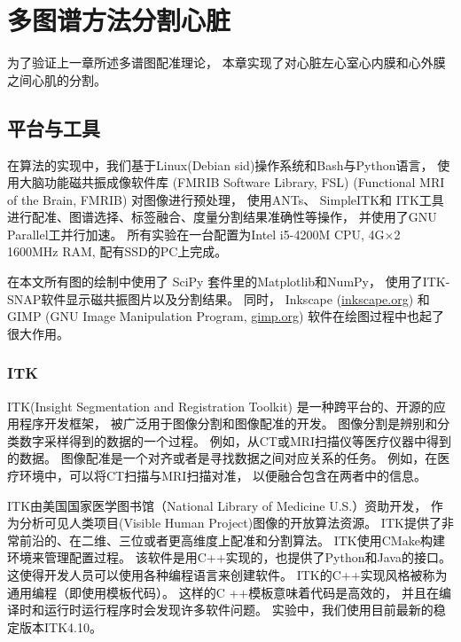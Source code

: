 
\chapter{多图谱方法分割心脏}
为了验证上一章所述多谱图配准理论，
本章实现了对心脏左心室心内膜和心外膜之间心肌的分割。

\section{平台与工具}
在算法的实现中，我们基于Linux(Debian sid)操作系统和Bash与Python语言，
使用大脑功能磁共振成像软件库
(FMRIB Software Library, FSL)
(Functional MRI of the Brain, FMRIB)
对图像进行预处理，
使用ANTs、
SimpleITK和
ITK工具
进行配准、图谱选择、标签融合、度量分割结果准确性等操作，
并使用了GNU Parallel工并行加速。
所有实验在一台配置为Intel i5-4200M CPU, 4G$\times$2 1600MHz RAM, 
配有SSD的PC上完成。

在本文所有图的绘制中使用了
SciPy
套件里的Matplotlib和NumPy，
使用了ITK-SNAP软件显示磁共振图片以及分割结果。
同时，
Inkscape (\href{http://inkscape.org}{inkscape.org})
和 GIMP (GNU Image Manipulation Program, \href{http://gimp.org}{gimp.org})
软件在绘图过程中也起了很大作用。

\subsection{ITK}
ITK(Insight Segmentation and Registration Toolkit)
是一种跨平台的、开源的应用程序开发框架，
被广泛用于图像分割和图像配准的开发。
图像分割是辨别和分类数字采样得到的数据的一个过程。
例如，从CT或MRI扫描仪等医疗仪器中得到的数据。
图像配准是一个对齐或者是寻找数据之间对应关系的任务。
例如，在医疗环境中，可以将CT扫描与MRI扫描对准，
以便融合包含在两者中的信息。

ITK由美国国家医学图书馆（National Library of Medicine U.S.）资助开发，
作为分析可见人类项目(Visible Human Project)图像的开放算法资源。
ITK提供了非常前沿的、在二维、三位或者更高维度上配准和分割算法。
ITK使用CMake构建环境来管理配置过程。
该软件是用C++实现的，也提供了Python和Java的接口。
这使得开发人员可以使用各种编程语言来创建软件。
ITK的C++实现风格被称为通用编程（即使用模板代码）。
这样的C ++模板意味着代码是高效的，
并且在编译时和运行时运行程序时会发现许多软件问题。
实验中，我们使用目前最新的稳定版本ITK4.10。
